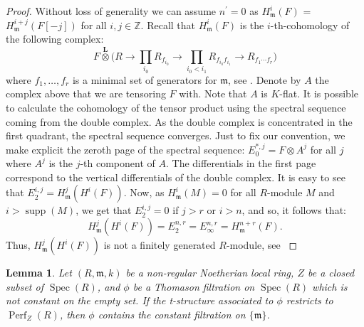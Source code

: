 \documentclass[11pt]{amsart}
\theoremstyle{plain}
\newtheorem{lemma}[theorem]{Lemma}
\theoremstyle{definition}
\numberwithin{equation}{section}
\numberwithin{theorem}{section}
\begin{document}
\begin{proof}
    Without loss of generality we can assume $n^\prime = 0$ as
    $H^i_{\mathfrak{m}}(F)$ = $H^{i+j}_{\mathfrak{m}}(F[-j])$ for all $i,j\in \mathbb{Z}$. Recall that $H^i_{\mathfrak{m}}(F)$ is the $i$-th-cohomology of the following complex:
    \begin{displaymath}
        F \overset{\mathbf{L}}{\otimes} \big( R \to \prod_{i_0}R_{f_{i_0}} \to \prod_{i_0 < i_1}R_{f_{i_0}f_{i_1}} \to R_{f_1\cdots f_r} \big)
    \end{displaymath}
    where $f_1,\ldots,f_r$ is a minimal set of generators for $\mathfrak{m}$, see \cite[\href{https://stacks.math.columbia.edu/tag/0A6R}{Tag 0A6R}]{StacksProject}. Denote by $A$ the complex above that we are tensoring $F$ with. Note that $A$ is $K$-flat. It is possible to calculate the cohomology of the tensor product using the spectral sequence coming from the double complex. As the double complex is concentrated in the first quadrant, the spectral sequence converges. Just to fix our convention, we make explicit the zeroth page of the spectral sequence: $E_0^{\ast,j}= F \otimes A^j$ for all $j$ where $A^j$ is the $j$-th component of $A$. The differentials in the first page correspond to the vertical differentials of the double complex. It is easy to see that $E_2^{i,j}=H^j_{\mathfrak{m}}(H^i(F))$. Now, as $H^i_{\mathfrak{m}}(M) = 0$ for all $R$-module $M$ and $i > \operatorname{supp}(M)$, we get that $E_2^{i,j}=0$ if $j > r$ or $i > n$, and so, it follows that:
    \begin{displaymath}
        H^j_{\mathfrak{m}}(H^i(F))=E_2^{n,r} = E_{\infty}^{n,r}=H^{n+r}_{\mathfrak{m}}(F).
    \end{displaymath}
    Thus, $H^j_{\mathfrak{m}}(H^i(F))$ is not a finitely generated $R$-module, see \cite[Proposition A.2]{Smith:2022}
\end{proof}

\begin{lemma}\label{lem:restrict_to_non_regular_local_ring}
    Let $(R,\mathfrak{m},k)$ be a non-regular Noetherian local ring, $Z$ be a closed subset of $\operatorname{Spec}(R)$, and $\phi$ be a Thomason filtration on $\operatorname{Spec}(R)$ which is not constant on the empty set. If the t-structure associated to $\phi$ restricts to $\operatorname{Perf}_Z(R)$, then $\phi$ contains the constant filtration on $\{\mathfrak{m}\}$.
\end{lemma}
\end{document}
